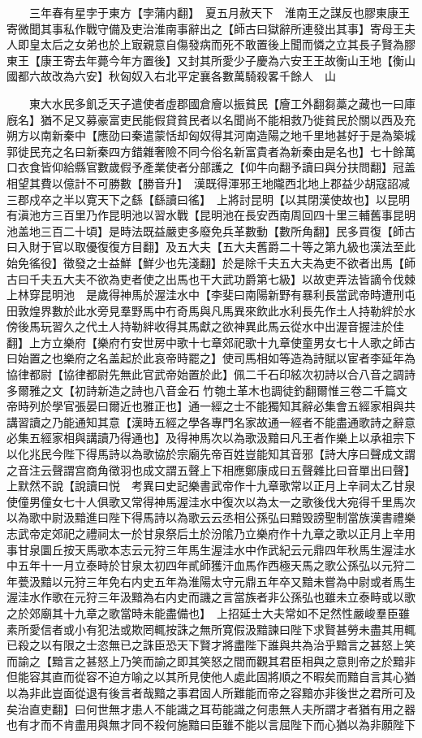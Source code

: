 　　三年春有星孛于東方【孛蒲内翻】　夏五月赦天下　淮南王之謀反也膠東康王寄微聞其事私作戰守備及吏治淮南事辭出之【師古曰獄辭所連發出其事】寄母王夫人即皇太后之女弟也於上㝡親意自傷發病而死不敢置後上聞而憐之立其長子賢為膠東王【康王寄去年薨今年方置後】又封其所愛少子慶為六安王王故衡山王地【衡山國都六故改為六安】秋匈奴入右北平定襄各數萬騎殺畧千餘人　山

　　東大水民多飢乏天子遣使者虛郡國倉廥以振貧民【廥工外翻芻藁之藏也一曰庫廐名】猶不足又募豪富吏民能假貸貧民者以名聞尚不能相救乃徙貧民於關以西及充朔方以南新秦中【應劭曰秦遣蒙恬却匈奴得其河南造陽之地千里地甚好于是為築城郭徙民充之名曰新秦四方錯雜奢險不同今俗名新富貴者為新秦由是名也】七十餘萬口衣食皆仰給縣官數歲假予產業使者分部護之【仰牛向翻予讀曰與分扶問翻】冠盖相望其費以億計不可勝數【勝音升】　漢既得渾邪王地隴西北地上郡益少胡寇詔减三郡戍卒之半以寛天下之繇【繇讀曰徭】　上將討昆明【以其閉漢使故也】以昆明有滇池方三百里乃作昆明池以習水戰【昆明池在長安西南周回四十里三輔舊事昆明池盖地三百二十頃】是時法既益嚴吏多廢免兵革數動【數所角翻】民多買復【師古曰入財于官以取優復復方目翻】及五大夫【五大夫舊爵二十等之第九級也漢法至此始免徭役】徵發之士益鮮【鮮少也先淺翻】於是除千夫五大夫為吏不欲者出馬【師古曰千夫五大夫不欲為吏者使之出馬也干大武功爵第七級】以故吏弄法皆謫令伐棘上林穿昆明池　是歲得神馬於渥洼水中【李斐曰南陽新野有暴利長當武帝時遭刑屯田敦煌界數於此水旁見羣野馬中冇奇馬與凡馬異來飲此水利長先作土人持勒絆於水傍後馬玩習久之代土人持勒絆收得其馬獻之欲神異此馬云從水中出渥音握洼於佳翻】上方立樂府【樂府冇安世房中歌十七章郊祀歌十九章使童男女七十人歌之師古曰始置之也樂府之名盖起於此哀帝時罷之】使司馬相如等造為詩賦以宦者李延年為協律都尉【協律都尉先無此官武帝始置於此】佩二千石印絃次初詩以合八音之調詩多爾雅之文【初詩新造之詩也八音金石竹匏土革木也調徒釣翻爾惟三卷二千篇文帝時列於學官張晏曰爾近也雅正也】通一經之士不能獨知其辭必集會五經家相與共講習讀之乃能通知其意【漢時五經之學各專門名家故通一經者不能盡通歌詩之辭意必集五經家相與講讀乃得通也】及得神馬次以為歌汲黯曰凡王者作樂上以承祖宗下以化兆民今陛下得馬詩以為歌協於宗廟先帝百姓豈能知其音邪【詩大序曰聲成文謂之音注云聲謂宫商角徵羽也成文謂五聲上下相應鄭康成曰五聲雜比曰音單出曰聲】上默然不說【說讀曰悦　考異曰史記樂書武帝作十九章歌常以正月上辛祠太乙甘泉使僮男僮女七十人俱歌又常得神馬渥洼水中復次以為太一之歌後伐大宛得千里馬次以為歌中尉汲黯進曰陛下得馬詩以為歌云云丞相公孫弘曰黯毁謗聖制當族漢書禮樂志武帝定郊祀之禮祠太一於甘泉祭后土於汾隂乃立樂府作十九章之歌以正月上辛用事甘泉圜丘按天馬歌本志云元狩三年馬生渥洼水中作武紀云元鼎四年秋馬生渥洼水中五年十一月立泰畤於甘泉太初四年貳師獲汗血馬作西極天馬之歌公孫弘以元狩二年甍汲黯以元狩三年免右内史五年為淮陽太守元鼎五年卒又黯未嘗為中尉或者馬生渥洼水作歌在元狩三年汲黯為右内史而譏之言當族者非公孫弘也雖未立泰畤或以歌之於郊廟其十九章之歌當時未能盡備也】　上招延士大夫常如不足然性嚴峻羣臣雖素所愛信者或小有犯法或欺罔輒按誅之無所寛假汲黯諫曰陛下求賢甚勞未盡其用輒已殺之以有限之士恣無已之誅臣恐天下賢才將盡陛下誰與共為治乎黯言之甚怒上笑而諭之【黯言之甚怒上乃笑而諭之即其笑怒之間而觀其君臣相與之意則帝之於黯非但能容其直而從容不迫方喻之以其所見使他人處此固將順之不暇矣而黯自言其心猶以為非此豈面從退有後言者哉黯之事君固人所難能而帝之容黯亦非後世之君所可及矣治直吏翻】曰何世無才患人不能識之耳苟能識之何患無人夫所謂才者猶有用之器也有才而不肯盡用與無才同不殺何施黯曰臣雖不能以言屈陛下而心猶以為非願陛下